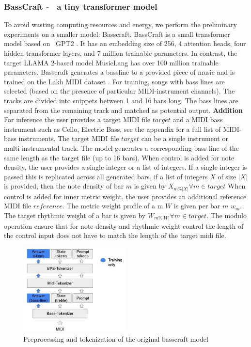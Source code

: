 \subsubsection{BassCraft -  a tiny transformer model}
To avoid wasting computing resources and energy, we perform the preliminary experiments on a smaller model: Basscraft. BassCraft is a small transformer model based on  GPT2 \cite{Radford_Wu_Child_Luan_gpt2_2019}. It has an embedding size of 256, 4 attention heads, four hidden transformer layers, and 7 million trainable parameters. In contrast, the target LLAMA 2-based model MusicLang has over 100 million trainable parameters. Basscraft generates a bassline to a provided piece of music and is trained on the Lakh MIDI dataset \cite{Raffel_2016}. For training, songs with bass lines are selected (based on the presence of particular MIDI-instrument channels). The tracks are divided into snippets between 1 and 16 bars long. The bass lines are separated from the remaining track and matched as potential output. 
\textbf{Addition} For inference the user provides a target MIDI file $target$ and a MIDI bass instrument such as Cello, Electric Bass, see the appendix for a full list of MIDI-bass instruments. The target MIDI file $target$ can be a single instrument or multi-instrumental track. The model generates a corresponding bass-line of the same length as the target file (up to 16 bars). When control is added for note density, the user provides a single integer or a list of integers. If a single integer is passed this is replicated across all generated bars, if a list of integers $X$ of size $|X|$ is provided, then the note density of bar $m$ is given by $X_{m\%|X|} \forall m \in target$
When control is added for inner metric weight, the user provides an additional reference MIDI file $reference$. The metric weight profile of a m $W$ is given per bar $m$ $w_{m}$. The target rhythmic weight of a bar is given by $W_{m\%|W|} \forall m \in target$. The modulo operation ensure that for note-density and rhythmic weight control the length of the control input does not have to match the length of the target midi file.    

\begin{figure}[H]
    \centering
    \includegraphics[width=0.5\textwidth]{IMAGES/Preprocessing1.jpg} 
    \caption{Preprocessing and tokenization of the original basscraft model}
    \label{fig:preprocessing1}
\end{figure}

